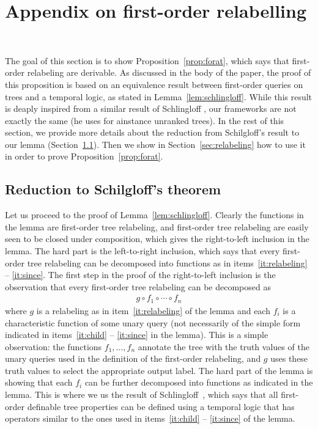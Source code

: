 \section{Appendix on first-order relabelling}~\label{sec:AppendixForat}

The goal of this section is to show Proposition~\ref{prop:forat}, which says that first-order relabeling are derivable. As discussed in the body of the paper, the proof of this proposition is based on an equivalence result between first-order queries on trees  and a temporal logic, as stated in Lemma~\ref{lem:schlingloff}. While this result is deaply inspired from a similar result of Schlingloff \cite{schlingloff1992expressive}, our frameworks are not exactly the same (he uses for ainstance unranked trees).  
In the rest of this section, we provide more details about the reduction from Schilgloff's result to our lemma (Section~\ref{sec:reduction-schilingloff}). Then we show in Section~\ref{sec:relabeling}  how to use it in order to prove Proposition~\ref{prop:forat}.  




\subsection{Reduction to Schilgloff's theorem}\label{sec:reduction-schilingloff}

Let us proceed to the proof of Lemma~\ref{lem:schlingloff}.
Clearly the functions in the lemma are first-order tree relabeling, and first-order tree relabeling are easily seen to be closed under composition, which gives the right-to-left inclusion in the lemma. The hard part is the left-to-right inclusion, which says that every first-order tree relabeling can be decomposed into functions as in items~\ref{it:relabeling} -- \ref{it:since}. 
The first  step in the proof of  the right-to-left inclusion is the observation that  every first-order tree relabeling can be decomposed as 
\begin{align*}
    g \circ f_1 \circ \cdots \circ f_n
\end{align*}
where $g$ is a relabeling as in item~\ref{it:relabeling} of the lemma and each $f_i$ is a  characteristic function of some unary query (not necessarily of the simple form indicated in items~\ref{it:child} -- \ref{it:since} in the lemma). This is a simple observation: the functions $f_1,\ldots,f_n$ annotate the tree with the truth values of the unary queries used in the definition of the  first-order relabeling, and $g$ uses these truth values to select the appropriate output label. The hard part of the lemma is showing that each $f_i$  can be further decomposed into functions as indicated in the lemma. This is where we us the result of Schlingloff~\cite[Theorem 2.6]{schlingloff1992expressive}, which says that all first-order definable tree properties can be defined using a temporal logic that has operators similar to the ones used in items~\ref{it:child} -- \ref{it:since} of the lemma. 

